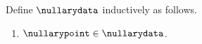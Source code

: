 \begin{datatype}\label{nullary_data}
    Define $\nullarydata$ inductively as follows.
    \begin{enumerate}
        \item $\nullarypoint\in\nullarydata$.
    \end{enumerate}
\end{datatype}

